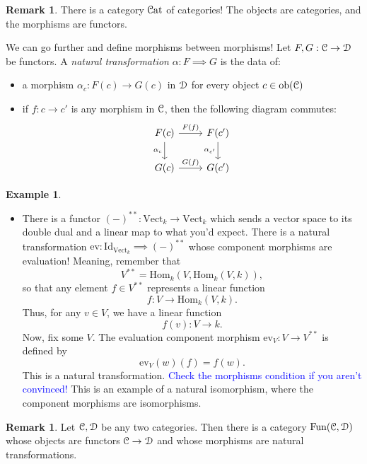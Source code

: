 \documentclass[10pt]{amsart}
\newcommand{\euscr}[1]{\EuScript{#1}}
\theoremstyle{definition}
\newtheorem{rmk}[thm]{Remark}
\newtheorem{ex}[thm]{Example}
\newcommand{\cdef}[1]{\textcolor{Bittersweet}{#1}}
\begin{document}
\begin{rmk}
    There is a category $\euscr{C}\text{at}$ of categories! The objects are categories, and the morphisms are functors.
\end{rmk}

We can go further and define morphisms between morphisms! Let $F, G:\euscr{C} \to \euscr{D}$ be functors. A \cdef{\emph{natural transformation}} $\alpha:F \implies G$ is the data of:
\begin{itemize}
    \item a morphism $\alpha_c:F(c) \to G(c)$ in $\euscr{D}$ for every object $c \in \textup{ob}(\euscr{C})$
    \item if $f:c \to c'$ is any morphism in $\euscr{C}$, then the following diagram commutes:
    \[\begin{tikzcd}
	{F(c)} & {F(c')} \\
	{G(c)} & {G(c')}
	\arrow["{F(f)}", from=1-1, to=1-2]
	\arrow["{\alpha_c}"', from=1-1, to=2-1]
	\arrow["{\alpha_{c'}}"', from=1-2, to=2-2]
	\arrow["{G(f)}", from=2-1, to=2-2]
    \end{tikzcd}\] 
\end{itemize}

\begin{ex}
    \hfill
    \begin{itemize}
        \item There is a functor $(-)^{**}:\text{Vect}_k \to \text{Vect}_k$ which sends a vector space to its double dual and a linear map to what you'd expect. There is a natural transformation $\text{ev}:\text{Id}_{\text{Vect}_k} \implies (-)^{**}$ whose component morphisms are evaluation! Meaning, remember that 
        \[V^{**} = \text{Hom}_k(V, \text{Hom}_k(V, k)),\]
        so that any element $f \in V^{**}$ represents a linear function
        \[f:V \to \text{Hom}_k(V, k).\]
        Thus, for any $v \in V$, we have a linear function
        \[f(v):V \to k.\]
        Now, fix some $V$. The evaluation component morphism $\text{ev}_V: V \to V^{**}$ is defined by 
        \[\text{ev}_V(w)(f) = f(w).\]
        This is a natural transformation. \textcolor{blue}{Check the morphisms condition if you aren't convinced!} This is an example of a natural isomorphism, where the component morphisms are isomorphisms.
    \end{itemize}
\end{ex}

\begin{rmk}
    Let $\euscr{C}, \euscr{D}$ be any two categories. Then there is a category $\text{Fun}(\euscr{C}, \euscr{D})$ whose objects are functors $\euscr{C} \to \euscr{D}$ and whose morphisms are natural transformations.
\end{rmk}
\end{document}
